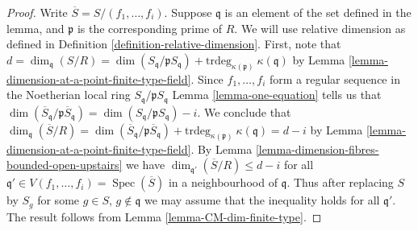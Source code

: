 \documentclass[10pt,a4paper]{amsart}
\theoremstyle{plain}
\theoremstyle{definition}
\theoremstyle{remark}
\numberwithin{equation}{subsection}
\def\Spec{\mathop{\mathrm{Spec}}}
\begin{document}
\begin{proof}
Write $\overline{S} = S/(f_1, \ldots, f_i)$.
Suppose $\mathfrak q$ is an element of the set defined in the
lemma, and $\mathfrak p$ is the corresponding prime of $R$.
We will use relative dimension as defined in
Definition \ref{definition-relative-dimension}.
First, note that $d = \dim_{\mathfrak q}(S/R) =
\dim(S_{\mathfrak q}/\mathfrak pS_{\mathfrak q}) +
\text{trdeg}_{\kappa(\mathfrak p)}\ \kappa(\mathfrak q)$
by Lemma \ref{lemma-dimension-at-a-point-finite-type-field}.
Since $f_1, \ldots, f_i$ form a regular sequence in the
Noetherian local ring $S_{\mathfrak q}/\mathfrak pS_{\mathfrak q}$
Lemma \ref{lemma-one-equation} tells us that
$\dim(\overline{S}_{\mathfrak q}/\mathfrak p\overline{S}_{\mathfrak q})
= \dim(S_{\mathfrak q}/\mathfrak pS_{\mathfrak q}) - i$.
We conclude that $\dim_{\mathfrak q}(\overline{S}/R)
= \dim(\overline{S}_{\mathfrak q}/\mathfrak p\overline{S}_{\mathfrak q}) +
\text{trdeg}_{\kappa(\mathfrak p)}\ \kappa(\mathfrak q)
= d - i$ by Lemma \ref{lemma-dimension-at-a-point-finite-type-field}.
By Lemma \ref{lemma-dimension-fibres-bounded-open-upstairs}
we have $\dim_{\mathfrak q'}(\overline{S}/R) \leq d - i$
for all $\mathfrak q' \in V(f_1, \ldots, f_i) = \Spec(\overline{S})$
in a neighbourhood of $\mathfrak q$. Thus after replacing
$S$ by $S_g$ for some $g \in S$, $g \not \in \mathfrak q$
we may assume that the inequality holds for all
$\mathfrak q'$. The result follows from Lemma
\ref{lemma-CM-dim-finite-type}.
\end{proof}
\end{document}

